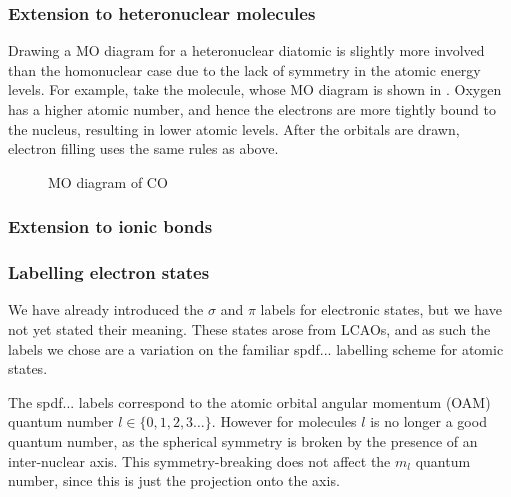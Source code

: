 
\subsubsection{Extension to heteronuclear molecules}


Drawing a MO diagram for a heteronuclear diatomic is slightly more involved than
the homonuclear case due to the lack of symmetry in the atomic energy levels.
For example, take the  molecule, whose MO diagram is shown in
. Oxygen has a higher atomic number, and hence the
electrons are more tightly bound to the nucleus, resulting in lower atomic
levels. After the orbitals are drawn, electron filling uses the same rules as
above.

\begin{figure}
  \caption{MO diagram of CO}
  \label{diaspec:fig:CO}
\end{figure}



\subsubsection{Extension to ionic bonds}

\subsubsection{Labelling electron states}


We have already introduced the $\sigma$ and $\pi$ labels for electronic states,
but we have not yet stated their meaning. These states arose from LCAOs, and as
such the labels we chose are a variation on the familiar spdf... labelling
scheme for atomic states. 

The spdf... labels correspond to the atomic orbital angular momentum (OAM)
quantum number $l \in \{0,1,2,3\ldots \}$. However for molecules $l$ is no
longer a good quantum number, as the spherical symmetry is broken by the
presence of an inter-nuclear axis. This symmetry-breaking does not affect the
$m_l$ quantum number, since this is just the projection onto the axis.

